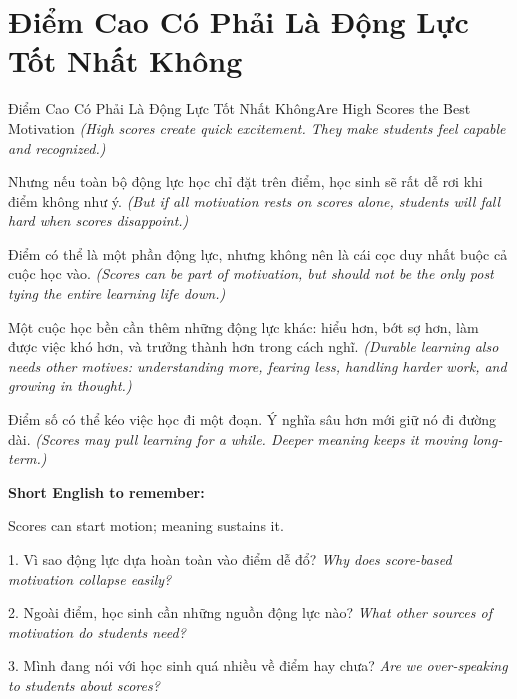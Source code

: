\section{Điểm Cao Có Phải Là Động Lực Tốt Nhất Không}
\begin{truyen}{Điểm Cao Có Phải Là Động Lực Tốt Nhất Không}{Are High Scores the Best Motivation}
\textit{(High scores create quick excitement. They make students feel capable and recognized.)}

Nhưng nếu toàn bộ động lực học chỉ đặt trên điểm, học sinh sẽ rất dễ rơi khi điểm không như ý.
\textit{(But if all motivation rests on scores alone, students will fall hard when scores disappoint.)}

Điểm có thể là một phần động lực, nhưng không nên là cái cọc duy nhất buộc cả cuộc học vào.
\textit{(Scores can be part of motivation, but should not be the only post tying the entire learning life down.)}

Một cuộc học bền cần thêm những động lực khác: hiểu hơn, bớt sợ hơn, làm được việc khó hơn, và trưởng thành hơn trong cách nghĩ.
\textit{(Durable learning also needs other motives: understanding more, fearing less, handling harder work, and growing in thought.)}
\end{truyen}

\begin{baihoc}
Điểm số có thể kéo việc học đi một đoạn. Ý nghĩa sâu hơn mới giữ nó đi đường dài.
\textit{(Scores may pull learning for a while. Deeper meaning keeps it moving long-term.)}
\end{baihoc}

\begin{ghinhoanh}
\textbf{Short English to remember:}

Scores can start motion; meaning sustains it.

\end{ghinhoanh}

\begin{tuhocnhanh}
1. Vì sao động lực dựa hoàn toàn vào điểm dễ đổ? \textit{Why does score-based motivation collapse easily?}

2. Ngoài điểm, học sinh cần những nguồn động lực nào? \textit{What other sources of motivation do students need?}

3. Mình đang nói với học sinh quá nhiều về điểm hay chưa? \textit{Are we over-speaking to students about scores?}
\end{tuhocnhanh}
\ngancach

